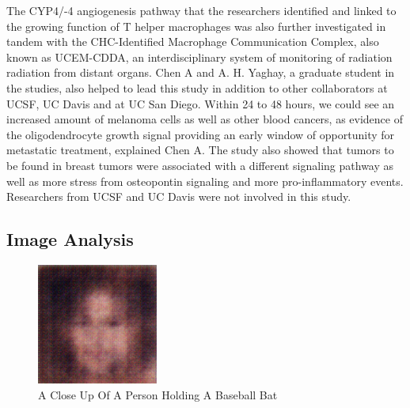 \documentclass{article}%
\begin{document}
The CYP4/{-}4 angiogenesis pathway that the researchers identified and linked to the growing function of T helper macrophages was also further investigated in tandem with the CHC{-}Identified Macrophage Communication Complex, also known as UCEM{-}CDDA, an interdisciplinary system of monitoring of radiation radiation from distant organs.\newline%
Chen A and A. H. Yaghay, a graduate student in the studies, also helped to lead this study in addition to other collaborators at UCSF, UC Davis and at UC San Diego.\newline%
Within 24 to 48 hours, we could see an increased amount of melanoma cells as well as other blood cancers, as evidence of the oligodendrocyte growth signal providing an early window of opportunity for metastatic treatment, explained Chen A.\newline%
The study also showed that tumors to be found in breast tumors were associated with a different signaling pathway as well as more stress from osteopontin signaling and more pro{-}inflammatory events. Researchers from UCSF and UC Davis were not involved in this study.

%
\subsection{Image Analysis}%
\label{subsec:ImageAnalysis}%


\begin{figure}[h!]%
\centering%
\includegraphics[width=150px]{500_fake_images/samples_5_268.png}%
\caption{A Close Up Of A Person Holding A Baseball Bat}%
\end{figure}

%
\end{document}
